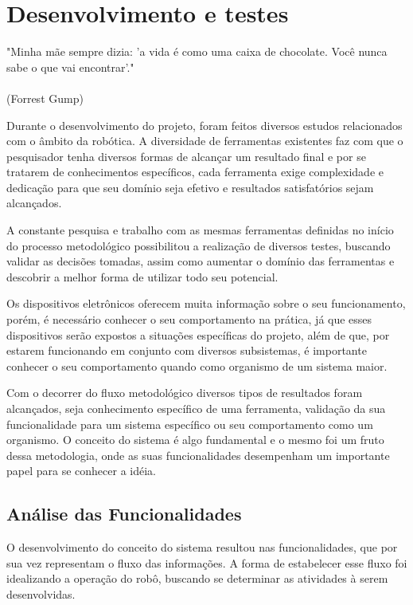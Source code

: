 \chapter{Desenvolvimento e testes}
\label{chap:desen_test}
\begin{flushright}
	"Minha mãe sempre dizia: 'a vida é como uma caixa de chocolate. Você nunca sabe o que vai encontrar'." \\
	\ \\
	(Forrest Gump)
\end{flushright}

Durante o desenvolvimento do projeto, foram feitos diversos estudos relacionados com o âmbito da robótica. A diversidade de ferramentas existentes faz com que o pesquisador tenha diversos formas de alcançar um resultado final e por se tratarem de conhecimentos específicos, cada ferramenta exige complexidade e dedicação para que seu domínio seja efetivo e resultados satisfatórios sejam alcançados.

A constante pesquisa e trabalho com as mesmas ferramentas definidas no início do processo metodológico possibilitou a realização de diversos testes, buscando validar as decisões tomadas, assim como aumentar o domínio das ferramentas e descobrir a melhor forma de utilizar todo seu potencial.

Os dispositivos eletrônicos oferecem muita informação sobre o seu funcionamento, porém, é necessário conhecer o seu comportamento na prática, já que esses dispositivos serão expostos a situações específicas do projeto, além de que, por estarem funcionando em conjunto com diversos subsistemas, é importante conhecer o seu comportamento quando como organismo de um sistema maior.

Com o decorrer do fluxo metodológico diversos tipos de resultados foram alcançados, seja conhecimento específico de uma ferramenta, validação da sua funcionalidade para um sistema específico ou seu comportamento como um organismo.  O conceito do sistema é algo fundamental e o mesmo foi um fruto dessa metodologia, onde as suas funcionalidades desempenham um importante papel para se conhecer a idéia.

\section{Análise das Funcionalidades}
\label{sec:analise_func}
O desenvolvimento do conceito do sistema resultou nas funcionalidades, que por sua vez representam o fluxo das informações. A forma de estabelecer esse fluxo foi idealizando a operação do robô, buscando se determinar as atividades à serem desenvolvidas.


